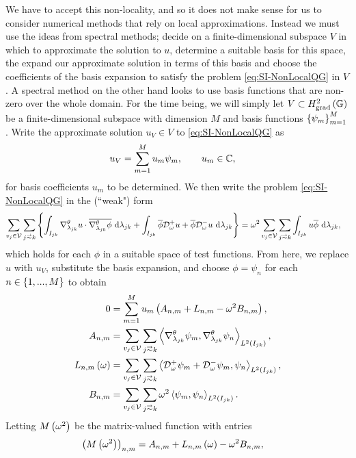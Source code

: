 We have to accept this non-locality, and so it does not make sense for us to consider numerical methods that rely on local approximations.
Instead we must use the ideas from spectral methods; decide on a finite-dimensional subspace $V$ in which to approximate the solution to $u$, determine a suitable basis for this space, the expand our approximate solution in terms of this basis and choose the coefficients of the basis expansion to satisfy the problem \eqref{eq:SI-NonLocalQG} in $V$.
A spectral method on the other hand looks to use basis functions that are non-zero over the whole domain.
For the time being, we will simply let $V\subset H^2_\mathrm{grad}\left( \mathbb{G} \right)$ be a finite-dimensional subspace with dimension $M$ and basis functions $\left\{ \psi_m \right\}_{m=1}^{M}$.
Write the approximate solution $u_V\in V$ to \eqref{eq:SI-NonLocalQG} as
\begin{align*}
	u_V &= \sum_{m=1}^M u_m\psi_m, \qquad u_m\in\mathbb{C},
\end{align*}
for basis coefficients $u_m$ to be determined.
We then write the problem \eqref{eq:SI-NonLocalQG} in the (``weak") form
\begin{align*}
	\sum_{v_j\in\vertSet}\sum_{j\conLeft k} 
	\clbracs{ 
	\integral{I_{jk}}{\tgrad_{\lambda_{jk}}u\cdot\overline{\tgrad_{\lambda_{jk}}\phi}}{\lambda_{jk}} 
	+ \integral{I_{jk}}{\overline{\phi}\dtn^+_{\omega}u + \overline{\phi}\dtn^-_{\omega}u}{\lambda_{jk}} 
	}
	&= \omega^2 \sum_{v_j\in\vertSet}\sum_{j\conLeft k}\integral{I_{jk}}{u\overline{\phi}}{\lambda_{jk}},
\end{align*}
which holds for each $\phi$ in a suitable space of test functions.
From here, we replace $u$ with $u_V$, substitute the basis expansion, and choose $\phi=\psi_n$ for each $n\in\left\{ 1,...,M \right\}$ to obtain
\begin{align*}
	0 &= 
	\sum_{m=1}^{M} u_m \bracs{ A_{n,m} + L_{n,m} - \omega^2 B_{n,m} }, \\
	A_{n,m} &= \sum_{v_j\in\vertSet}\sum_{j\conLeft k} \ip{\tgrad_{\lambda_{jk}}\psi_m}{\tgrad_{\lambda_{jk}}\psi_n}_{L^2\bracs{I_{jk}}}, \\
	L_{n,m}\bracs{\omega} &= \sum_{v_j\in\vertSet}\sum_{j\conLeft k} \ip{\dtn^+_{\omega}\psi_m + \dtn^-_{\omega}\psi_m}{\psi_n}_{L^2\bracs{I_{jk}}}, \\
	B_{n,m} &= \sum_{v_j\in\vertSet}\sum_{j\conLeft k} \omega^2\ip{\psi_m}{\psi_n}_{L^2\bracs{I_{jk}}}.
\end{align*}
Letting $M\left( \omega^2 \right)$ be the matrix-valued function with entries
\begin{align*}
	\left( M\left( \omega^2 \right) \right)_{n,m} &= A_{n,m} + L_{n,m}\left( \omega \right) - \omega^2 B_{n,m},
\end{align*}
